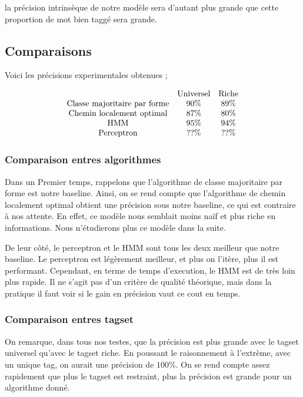 \documentclass{article}
\begin{document}
la précision intrinsèque de notre modèle sera d'autant plus grande que cette proportion de mot bien taggé sera grande.

\subsection{Comparaisons}

Voici les précisions experimentales obtenues ;

$$
\begin{array}{c c c}
&\text{Universel}&\text{Riche}\\
\text{Classe majoritaire par forme}&90\%&89\%\\
\text{Chemin localement optimal}&87\%&80\%\\
\text{HMM}&95\%&94\%\\
\text{Perceptron}&??\%&??\%\\
\end{array}
$$

\subsubsection{Comparaison entres algorithmes}

Dans un Premier temps, rappelons que l'algorithme de classe majoritaire par forme est notre baseline. Ainsi, on se rend compte que l'algorithme de chemin localement optimal obtient une précision sous notre baseline, ce qui est contraire à nos attente. En effet, ce modèle nous semblait moins naïf et plus riche en informations. Nous n'étudierons plus ce modèle dans la suite.

De leur côté, le perceptron et le HMM sont tous les deux meilleur que notre baseline. Le perceptron est légèrement meilleur, et plus on l'itère, plus il est performant. Cependant, en terme de temps d'execution, le HMM est de très loin plus rapide. Il ne s'agit pas d'un critère de qualité théorique, mais dans la pratique il faut voir si le gain en précision vaut ce cout en temps.

\subsubsection{Comparaison entres tagset}

On remarque, dans tous nos testes, que la précision est plus grande avec le tagset universel qu'avec le tagset riche. En poussant le raisonnement à l'extrème, avec un unique tag, on aurait une précision de $100\%$. On se rend compte assez rapidement que plus le tagset est restraint, plus la précision est grande pour un algorithme donné.
\end{document}
